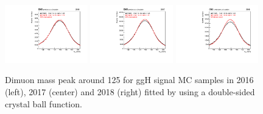 \begin{figure}[h!]
    \centering
    \includegraphics[width=0.32\textwidth]{images_geofit/ggH_mass_geofit_2016.pdf}
    \includegraphics[width=0.32\textwidth]{images_geofit/ggH_mass_geofit_2017.pdf}
    \includegraphics[width=0.32\textwidth]{images_geofit/ggH_mass_geofit_2018.pdf}
    \caption{Dimuon mass peak around 125 \gev for ggH signal MC samples in 2016 (left), 2017 (center) and 2018 (right) fitted by using a double-sided crystal ball function.}
    \label{fig:ggH_dimu_mass_geofit}
\end{figure}





